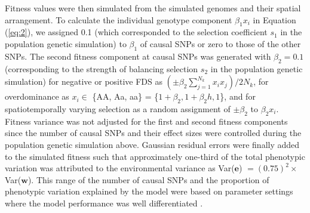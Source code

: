 \documentclass[12pt,]{article}
\begin{document}
Fitness values were then simulated from the simulated genomes and their spatial arrangement. To calculate the individual genotype component $\beta_1x_i$ in Equation (\ref{eq:2}), we assigned 0.1 (which corresponded to the selection coefficient $s_1$ in the population genetic simulation) to $\beta_1$ of causal SNPs or zero to those of the other SNPs. The second fitness component at causal SNPs was generated with $\beta_2 = 0.1$ (corresponding to the strength of balancing selection $s_2$ in the population genetic simulation) for negative or positive FDS as $(\pm \beta_2\sum^{N_{k}}_{j=1}{x_ix_j}) / 2N_k$, for overdominance as $x_i \in$ \{AA, Aa, aa\} = \{$1+\beta_2, 1+\beta_2h, 1$\}, and for spatiotemporally varying selection as a random assignment of $\pm \beta_2$ to $\beta_2x_i$. Fitness variance was not adjusted for the first and second fitness components since the number of causal SNPs and their effect sizes were controlled during the population genetic simulation above. Gaussian residual errors were finally added to the simulated fitness such that approximately one-third of the total phenotypic variation was attributed to the environmental variance as Var($\mathbf{e}$) $=(0.75)^2 \times$Var($\mathbf{w}$). This range of the number of causal SNPs and the proportion of phenotypic variation explained by the model were based on parameter settings where the model performance was well differentiated \citep{sato2019neighbor}.
\end{document}
